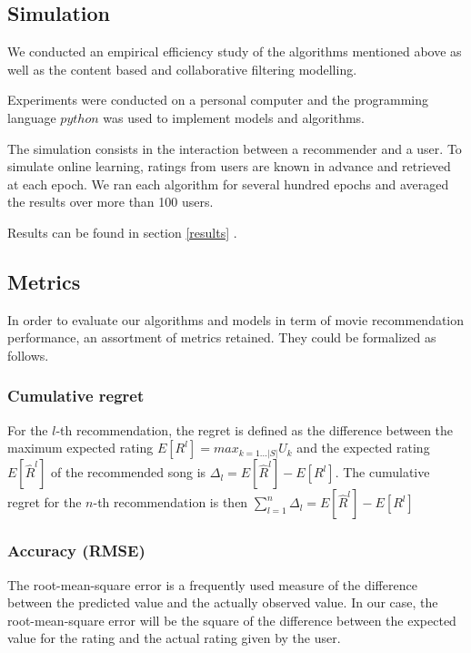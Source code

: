 \documentclass[letterpaper]{article}
\begin{document}
\subsection{Simulation}

We conducted an empirical efficiency study of the algorithms mentioned above as well as the content based and collaborative filtering modelling.

Experiments were conducted on a personal computer and the programming language $python$ was used to implement models and algorithms.

The simulation consists in the interaction between a recommender and a user. To simulate online learning, ratings from users are known in advance and retrieved at each epoch. 
We ran each algorithm for several hundred epochs and averaged the results over more than 100 users. 

Results can be found in section \ref{results} .

\subsection{Metrics} \label{metrics}

In order to evaluate our algorithms and models in term of movie recommendation performance, an assortment of metrics retained. They could be formalized as follows.

\subsubsection{Cumulative regret}

For the $l$-th recommendation, the regret is defined as the difference between the maximum expected rating $ E[R^{l}] = max_{k=1...|S|} U_{k} $  and the expected rating $E[\hat R^{l}]$ of the recommended song is  $\Delta_{l} = E[\hat{R} ^{l}] - E[R^{l}]$. The cumulative regret for the $n$-th recommendation is then $ \sum_{l=1}^{n} \Delta_{l} = E[\hat{R} ^{l}] - E[R^{l}]$

\subsubsection{Accuracy (RMSE)}

The root-mean-square error is a frequently used measure of the difference between the predicted value and the actually observed value. In our case, the root-mean-square error will be the square of the difference between the expected value for the rating and the actual rating given by the user.
\end{document}
